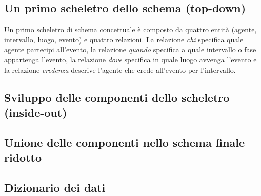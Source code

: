 \documentclass{article}
\begin{document}
\subsection{Un primo scheletro dello schema (top-down)}
Un primo scheletro di schema concettuale è composto da quattro entità (agente,
intervallo, luogo, evento) e quattro relazioni. La relazione \emph{chi}
specifica quale agente partecipi all'evento, la relazione \emph{quando}
specifica a quale intervallo o fase appartenga l'evento, la relazione
\emph{dove} specifica in quale luogo avvenga l'evento e la relazione
\emph{credenza} descrive l'agente che crede all'evento per l'intervallo.
\subsection{Sviluppo delle componenti dello scheletro (inside-out)}

\subsection{Unione delle componenti nello schema finale ridotto}

\subsection{Dizionario dei dati}
\end{document}
